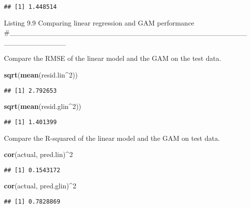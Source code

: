 \documentclass[]{article}
\newenvironment{Shaded}{\begin{snugshade}}{\end{snugshade}}
\newcommand{\DataTypeTok}[1]{\textcolor[rgb]{0.13,0.29,0.53}{#1}}
\newcommand{\DecValTok}[1]{\textcolor[rgb]{0.00,0.00,0.81}{#1}}
\newcommand{\KeywordTok}[1]{\textcolor[rgb]{0.13,0.29,0.53}{\textbf{#1}}}
\newcommand{\NormalTok}[1]{#1}
\newcommand{\OperatorTok}[1]{\textcolor[rgb]{0.81,0.36,0.00}{\textbf{#1}}}
\newcommand{\StringTok}[1]{\textcolor[rgb]{0.31,0.60,0.02}{#1}}
\begin{document}
\begin{verbatim}
## [1] 1.448514
\end{verbatim}

Listing 9.9 Comparing linear regression and GAM performance
\#\_\_\_\_\_\_\_\_\_\_\_\_\_\_\_\_\_\_\_\_\_\_\_\_\_\_\_\_\_\_\_\_\_\_\_\_\_\_\_\_\_\_\_\_\_\_\_\_\_\_\_\_\_\_\_\_\_\_

\begin{Shaded}
\end{Shaded}

Compare the RMSE of the linear model and the GAM on the test data.

\begin{Shaded}
\begin{Highlighting}[]
\KeywordTok{sqrt}\NormalTok{(}\KeywordTok{mean}\NormalTok{(resid.lin}\OperatorTok{^}\DecValTok{2}\NormalTok{))}
\end{Highlighting}
\end{Shaded}

\begin{verbatim}
## [1] 2.792653
\end{verbatim}

\begin{Shaded}
\begin{Highlighting}[]
\KeywordTok{sqrt}\NormalTok{(}\KeywordTok{mean}\NormalTok{(resid.glin}\OperatorTok{^}\DecValTok{2}\NormalTok{))}
\end{Highlighting}
\end{Shaded}

\begin{verbatim}
## [1] 1.401399
\end{verbatim}

Compare the R-squared of the linear model and the GAM on test data.

\begin{Shaded}
\begin{Highlighting}[]
\KeywordTok{cor}\NormalTok{(actual, pred.lin)}\OperatorTok{^}\DecValTok{2}
\end{Highlighting}
\end{Shaded}

\begin{verbatim}
## [1] 0.1543172
\end{verbatim}

\begin{Shaded}
\begin{Highlighting}[]
\KeywordTok{cor}\NormalTok{(actual, pred.glin)}\OperatorTok{^}\DecValTok{2}
\end{Highlighting}
\end{Shaded}

\begin{verbatim}
## [1] 0.7828869
\end{verbatim}
\end{document}
